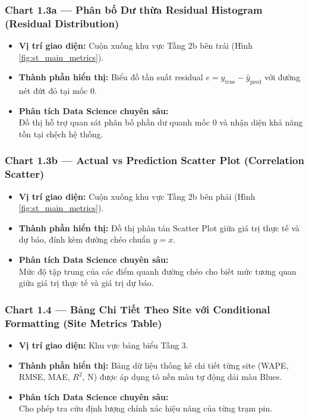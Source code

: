 \documentclass[12pt,a4paper]{article}
\begin{document}
\subsubsection{Chart 1.3a — Phân bố Dư thừa Residual Histogram (Residual Distribution)}
\begin{itemize}
    \item \textbf{Vị trí giao diện:} Cuộn xuống khu vực Tầng 2b bên trái (Hình \ref{fig:st_main_metrics}).
    \item \textbf{Thành phần hiển thị:} Biểu đồ tần suất residual $e = y_{\text{true}} - \hat{y}_{\text{pred}}$ với đường nét đứt đỏ tại mốc 0.
    \item \textbf{Phân tích Data Science chuyên sâu:}\\ 
    Đồ thị hỗ trợ quan sát phân bố phần dư quanh mốc 0 và nhận diện khả năng tồn tại chệch hệ thống.
\end{itemize}

\subsubsection{Chart 1.3b — Actual vs Prediction Scatter Plot (Correlation Scatter)}
\begin{itemize}
    \item \textbf{Vị trí giao diện:} Cuộn xuống khu vực Tầng 2b bên phải (Hình \ref{fig:st_main_metrics}).
    \item \textbf{Thành phần hiển thị:} Đồ thị phân tán Scatter Plot giữa giá trị thực tế và dự báo, đính kèm đường chéo chuẩn $y=x$.
    \item \textbf{Phân tích Data Science chuyên sâu:}\\ 
    Mức độ tập trung của các điểm quanh đường chéo cho biết mức tương quan giữa giá trị thực tế và giá trị dự báo.
\end{itemize}

\subsubsection{Chart 1.4 — Bảng Chi Tiết Theo Site với Conditional Formatting (Site Metrics Table)}
\begin{itemize}
    \item \textbf{Vị trí giao diện:} Khu vực bảng biểu Tầng 3.
    \item \textbf{Thành phần hiển thị:} Bảng dữ liệu thống kê chi tiết từng site (WAPE, RMSE, MAE, $R^2$, N) được áp dụng tô nền màu tự động dải màu Blues.
    \item \textbf{Phân tích Data Science chuyên sâu:}\\ 
    Cho phép tra cứu định lượng chính xác hiệu năng của từng trạm pin.
\end{itemize}
\end{document}

